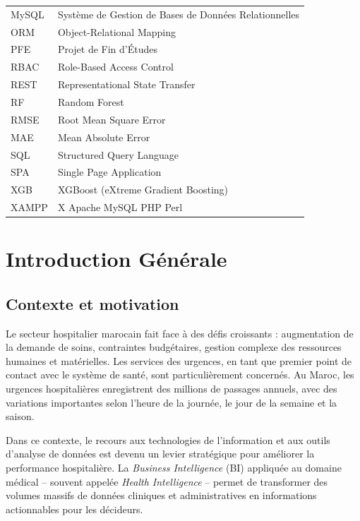 \documentclass[12pt,a4paper]{report}
\begin{document}
\begin{longtable}{p{3.2cm} p{10.5cm}}
		MySQL   & Système de Gestion de Bases de Données Relationnelles \\
		ORM     & Object-Relational Mapping \\
		PFE     & Projet de Fin d'Études \\
		RBAC    & Role-Based Access Control \\
		REST    & Representational State Transfer \\
		RF      & Random Forest \\
		RMSE    & Root Mean Square Error \\
		MAE     & Mean Absolute Error \\
		SQL     & Structured Query Language \\
		SPA     & Single Page Application \\
		XGB     & XGBoost (eXtreme Gradient Boosting) \\
		XAMPP   & X Apache MySQL PHP Perl \\
	\end{longtable}
	
	\cleardoublepage
	\setcounter{page}{1}
	
	\chapter*{Introduction Générale}
	
	\section*{Contexte et motivation}
	
	Le secteur hospitalier marocain fait face à des défis croissants : augmentation de la demande
	de soins, contraintes budgétaires, gestion complexe des ressources humaines et matérielles.
	Les services des urgences, en tant que premier point de contact avec le système de santé,
	sont particulièrement concernés. Au Maroc, les urgences hospitalières enregistrent des millions
	de passages annuels, avec des variations importantes selon l'heure de la journée, le jour de
	la semaine et la saison.
	
	Dans ce contexte, le recours aux technologies de l'information et aux outils d'analyse de
	données est devenu un levier stratégique pour améliorer la performance hospitalière. La
	\textit{Business Intelligence} (BI) appliquée au domaine médical -- souvent appelée
	\textit{Health Intelligence} -- permet de transformer des volumes massifs de données cliniques
	et administratives en informations actionnables pour les décideurs.
	
\end{document}
